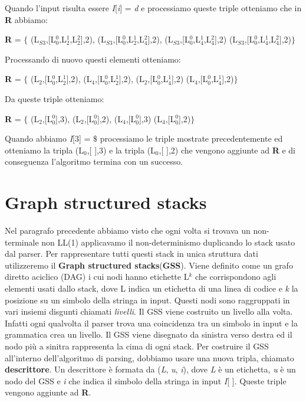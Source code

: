 \vspace{0.3cm}Quando l'input risulta essere \textit{I}[\textit{i}] = \textit{d} e processiamo queste triple otteniamo che in \textbf{R} abbiamo:\par 
\vspace{0.3cm}\textbf{R} = $\{$ (L$_{S3}$,[L$_0^{0}$,L$_2^{1}$,L$_2^{2}$],2), (L$_{S3}$,[L$_0^{0}$,L$_2^{1}$,L$_4^{2}$],2),  (L$_{S3}$,[L$_0^{0}$,L$_4^{1}$,L$_4^{2}$],2) (L$_{S3}$,[L$_0^{0}$,L$_4^{1}$,L$_4^{2}$],2)$\}$\par 
\vspace{0.3cm} Processando di nuovo questi elementi otteniamo:\par 
\vspace{0.3cm}\hspace{0.5cm}\textbf{R} = $\{$ (L$_{2}$,[L$_0^{0}$,L$_2^{1}$],2), (L$_{4}$,[L$_0^{0}$,L$_2^{1}$],2),  (L$_{2}$,[L$_0^{0}$,L$_4^{1}$],2) (L$_{4}$,[L$_0^{0}$,L$_4^{1}$],2)$\}$\par 
\vspace{0.3cm} Da queste triple otteniamo:\par 
\vspace{0.3cm}\hspace{0.5cm}\textbf{R} = $\{$ (L$_{2}$,[L$_0^{0}$],3), (L$_{2}$,[L$_0^{0}$],2),  (L$_{4}$,[L$_0^{0}$],3) (L$_{4}$,[L$_0^{0}$],2)$\}$\par 
\vspace{0.3cm} Quando abbiamo \textit{I}[3] = $\$$ processiamo le triple mostrate precedentemente ed otteniamo la tripla (L$_{0}$,[ ],3) e la tripla (L$_{0}$,[ ],2) che vengono aggiunte ad \textbf{R} e di conseguenza l'algoritmo termina con un successo.
\section{Graph structured stacks}
Nel paragrafo precedente abbiamo visto che ogni volta si trovava un non-terminale non LL(1) applicavamo il non-determinismo duplicando lo stack usato dal parser. Per rappresentare tutti questi stack in unica struttura dati utilizzeremo il \textbf{Graph structured stacks}(\textbf{GSS}). Viene definito \cite{tesi: lr} come un grafo diretto aciclico (DAG) i cui nodi hanno etichette L$^{k}$ che corrispondono agli elementi usati dallo stack, dove L indica un etichetta di una linea di codice e \textit{k} la posizione su un simbolo della stringa in input. Questi nodi sono raggruppati in vari insiemi disgunti chiamati \textit{livelli}. Il GSS viene costruito un livello alla volta. Infatti ogni qualvolta il parser trova una coincidenza tra un simbolo in input e la grammatica crea un livello. Il GSS viene disegnato da sinistra verso destra ed il nodo più a sinitra rappresenta la cima di ogni stack. Per costruire il GSS all'interno dell'algoritmo di parsing, dobbiamo usare una nuova tripla, chiamato \textbf{descrittore}. Un descrittore è formata da (\textit{L}, \textit{u}, \textit{i}), dove \textit{L} è un etichetta, \textit{u} è un nodo del GSS e \textit{i} che indica il simbolo della stringa in input \textit{I}[ ]. Queste triple vengono aggiunte ad \textbf{R}.
